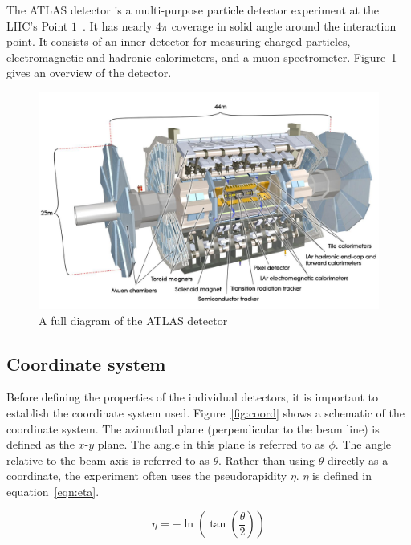 The ATLAS detector is a multi-purpose particle detector experiment at the LHC's Point $1$~\cite{ATLASPaper}. It has nearly $4\pi$ coverage in solid angle around the interaction point. It consists of an inner detector for measuring charged particles, electromagnetic and hadronic calorimeters, and a muon spectrometer. Figure~\ref{fig:ATLAS_overview} gives an overview of the detector.

\begin{figure}[h!]
  \centering
  \captionsetup{justification=centering}

  \includegraphics[width=\textwidth]{figures/ATLAS}
   \caption{A full diagram of the ATLAS detector~\cite{ATLASPaper}}
  \label{fig:ATLAS_overview}
\end{figure}

\subsection{Coordinate system}

Before defining the properties of the individual detectors, it is important to establish the coordinate system used. Figure~\ref{fig:coord} shows a schematic of the coordinate system. The azimuthal plane (perpendicular to the beam line) is defined as the $x$-$y$ plane. The angle in this plane is referred to as $\phi$. The angle relative to the beam axis is referred to as $\theta$. Rather than using $\theta$ directly as a coordinate, the experiment often uses the pseudorapidity $\eta$. $\eta$ is defined in equation~\ref{eqn:eta}. 

\begin{equation}
\label{eqn:eta}
\eta = - \ln{\left(\tan\left(\frac{\theta}{2}\right)\right)}
\end{equation}


